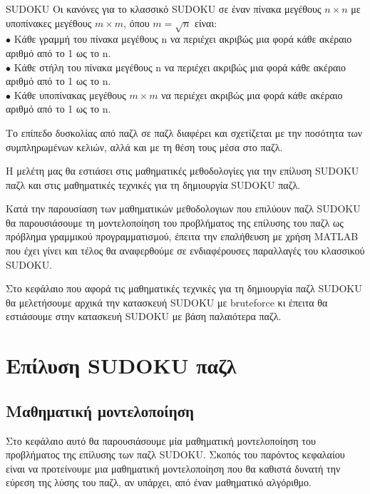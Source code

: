 \documentclass[12pt]{book}
\theoremstyle{definition}
\begin{document}
\begin{mytheorem}{SUDOKU}{}
	Οι κανόνες για το κλασσικό SUDOKU σε έναν πίνακα μεγέθους \(n \times n\) με υποπίνακες μεγέθους \(m \times m\), 	όπου \(m = \sqrt{n}\) είναι: \\
	\(\bullet\) Κάθε γραμμή του πίνακα μεγέθους n να περιέχει ακριβώς μια φορά κάθε ακέραιο αριθμό από το 1 ως το n. \\
	\(\bullet\) Κάθε στήλη του πίνακα μεγέθους n να περιέχει ακριβώς μια φορά κάθε ακέραιο αριθμό από το 1 ως το n. \\
	\(\bullet\) Κάθε υποπίνακας μεγέθους \(m \times m\) να περιέχει ακριβώς μια φορά κάθε ακέραιο αριθμό από το 1 ως το n. \\
\end{mytheorem}

Το επίπεδο δυσκολίας από παζλ σε παζλ διαφέρει και σχετίζεται με την ποσότητα των συμπληρωμένων κελιών, αλλά και με τη θέση τους μέσα στο παζλ. \par

Η μελέτη μας θα εστιάσει στις μαθηματικές μεθοδολογίες για την επίλυση SUDOKU παζλ και στις μαθηματικές τεχνικές για τη δημιουργία SUDOKU παζλ. \par

Κατά την παρουσίαση των μαθηματικών μεθοδολογιων που επιλύουν παζλ SUDOKU θα παρουσιάσουμε τη μοντελοποίηση του προβλήματος της επίλυσης του παζλ ως
πρόβλημα γραμμικού προγραμματισμού, έπειτα την επαλήθευση με χρήση MATLAB που έχει γίνει και τέλος θα αναφερθούμε σε ενδιαφέρουσες παραλλαγές του κλασσικού SUDOKU. \par

Στο κεφάλαιο που αφορά τις μαθηματικές τεχνικές για τη δημιουργία παζλ SUDOKU θα μελετήσουμε αρχικά την κατασκευή SUDOKU με bruteforce κι έπειτα θα εστιάσουμε στην κατασκευή SUDOKU με βάση παλαιότερα παζλ. \par

\chapter{Επίλυση SUDOKU παζλ}
\section{Μαθηματική μοντελοποίηση}

Στο κεφάλαιο αυτό θα παρουσιάσουμε μία μαθηματική μοντελοποίηση του προβλήματος της επίλυσης των παζλ SUDOKU. Σκοπός του παρόντος κεφαλαίου είναι να προτείνουμε μια μαθηματική μοντελοποίηση που θα καθιστά δυνατή την εύρεση της λύσης του παζλ, αν υπάρχει, από έναν μαθηματικό αλγόριθμο. \par
\end{document}
